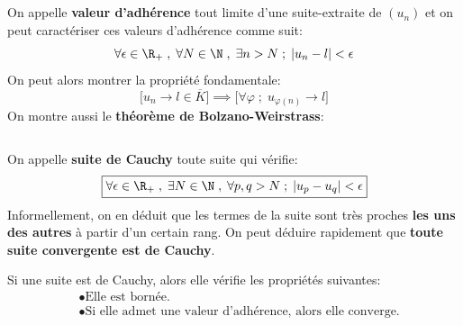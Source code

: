 \subsection*{}
On appelle \textbf{valeur d'adhérence} tout limite d'une suite-extraite de \((u_n)\) et on peut caractériser ces valeurs d'adhérence comme suit:
\[
    \forall \epsilon \in \R_+ \; , \; \forall N \in \N \; , \; \exists n > N \; ; \; |u_n - l| < \epsilon 
\]
On peut alors montrer la propriété fondamentale:
\[
    \Bigr[u_n \rightarrow l \in \overline{K} \Bigr] \implies \Bigr[ \forall \varphi \; ; \; u_{\varphi(n)} \rightarrow l \Bigr]
\]
On montre aussi le \textbf{théorème de Bolzano-Weirstrass}:
\begin{center}
\end{center}

\subsection*{}
On appelle \textbf{suite de Cauchy} toute suite qui vérifie:
\[
    \boxed{
        \forall \epsilon \in \R_+ \; , \; \exists N \in \N \; , \; \forall p, q > N \; ; \; |u_p - u_q| < \epsilon 
    }
\]
Informellement, on en déduit que les termes de la suite sont très proches \textbf{les uns des autres} à partir d'un certain rang.\+
On peut déduire rapidement que \textbf{toute suite convergente est de Cauchy}.\<

Si une suite est de Cauchy, alors elle vérifie les propriétés suivantes:
\begin{align*}
    &\bullet \text{Elle est bornée.} \\
    &\bullet \text{Si elle admet une valeur d'adhérence, alors elle converge.}
\end{align*}


